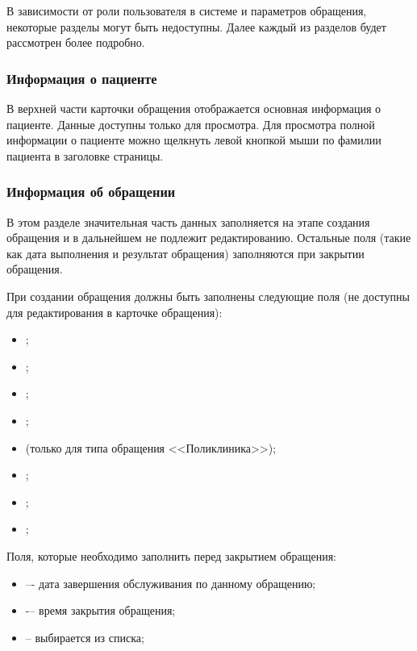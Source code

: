 {В зависимости от роли пользователя в системе и параметров обращения, некоторые разделы могут быть недоступны. Далее каждый из разделов будет рассмотрен более подробно.

\subsubsection{Информация о пациенте}

В верхней части карточки обращения отображается основная информация о пациенте. Данные доступны только для просмотра. Для просмотра полной информации о пациенте можно щелкнуть левой кнопкой мыши по фамилии пациента в заголовке страницы. 


\subsubsection{Информация об обращении}

В этом разделе значительная часть данных заполняется на этапе создания обращения и в дальнейшем не подлежит редактированию. Остальные поля (такие как дата выполнения и результат обращения) заполняются при закрытии обращения. 

При создании обращения должны быть заполнены следующие поля (не доступны для редактирования в карточке обращения):
\begin{itemize}
  \item {};
  \item {};
  \item {};
  \item {};
  \item {} (только для типа обращения <<Поликлиника>>);
  \item {};
  \item {};
  \item {};
\end{itemize}

Поля, которые необходимо заполнить перед закрытием обращения:
\begin{itemize}   
  \item {} –- дата завершения обслуживания по данному обращению;
  \item {} -– время закрытия обращения;
  \item {} -- выбирается из списка;
\end{itemize}

}
